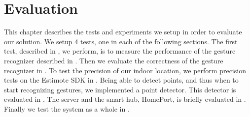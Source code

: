 \chapter{Evaluation}\label{chap:evaluation}
This chapter describes the tests and experiments we setup in order to evaluate our solution. 
We setup \num{4} tests, one in each of the following sections. 
The first test, described in , we perform, 
is to measure the performance of the gesture recognizer described in . 
Then we evaluate the correctness of the gesture recognizer in .
To test the precision of our indoor location, 
we perform precision tests on the Estimote SDK in .
Being able to detect points, and thus when to start recognizing gestures, we implemented a point detector. This detector is evaluated in .
The server and the smart hub, HomePort, is briefly evaluated in .
Finally we test the system as a whole in .







% 